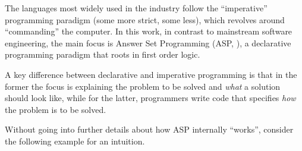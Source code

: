 \documentclass{vutinfth} %
\begin{document}
The languages most widely used in the industry follow the \enquote{imperative} programming paradigm (some more strict, some less), which revolves around \enquote{commanding} the computer. In this work, in contrast to mainstream software engineering, the main focus is Answer Set Programming (ASP, \cite{stable}), a declarative programming paradigm that roots in first order logic.

A key difference between declarative and imperative programming is that in the former the focus is explaining the problem to be solved and \emph{what} a solution should look like, while for the latter, programmers write code that specifies \emph{how} the problem is to be solved.

Without going into further details about how ASP internally \enquote{works}, consider the following example for an intuition.
\end{document}
